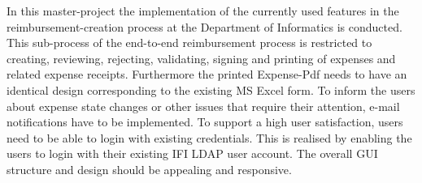 In this master-project the implementation of the currently used features in the reimbursement-creation process at the Department of Informatics is conducted. This sub-process of the end-to-end reimbursement process is restricted to creating, reviewing, rejecting, validating, signing and printing of expenses and related expense receipts. Furthermore the printed Expense-Pdf needs to have an identical design corresponding to the existing MS Excel form. To inform the users about expense state changes or other issues that require their attention, e-mail notifications have to be implemented. To support a high user satisfaction, users need to be able to login with existing credentials. This is realised by enabling the users to login with their existing IFI LDAP user account. The overall GUI structure and design should be appealing and responsive.